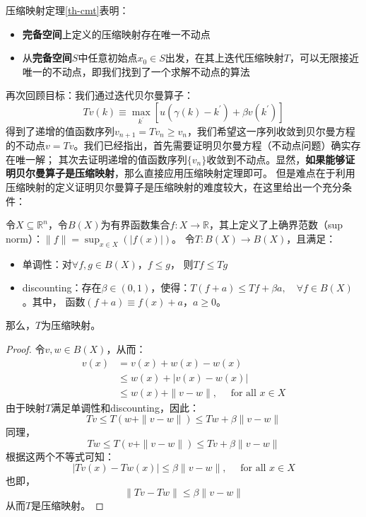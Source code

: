 压缩映射定理\ref{th-cmt}表明：
\begin{itemize}
    \item \textbf{完备空间}上定义的压缩映射存在唯一不动点
    \item 从\textbf{完备空间}$S$中任意初始点$x_0 \in S$出发，在其上迭代压缩映射$T$，可以无限接近唯一的不动点，即我们找到了一个求解不动点的算法
\end{itemize}

再次回顾目标：我们通过迭代贝尔曼算子：
$$
Tv\left(k\right) \equiv \max_{k^{\prime}} \left[u\left(\gamma\left(k\right)-k^{\prime}\right)+\beta v\left(k^{\prime}\right)\right]
$$
得到了递增的值函数序列$v_{n+1}=Tv_n \geq v_n$，我们希望这一序列收敛到贝尔曼方程的不动点$v=Tv$。我们已经指出，首先需要证明贝尔曼方程（不动点问题）确实存在唯一解；
其次去证明递增的值函数序列$\{v_n\}$收敛到不动点。显然，\textbf{如果能够证明贝尔曼算子是压缩映射}，那么直接应用压缩映射定理即可。
但是难点在于利用压缩映射的定义证明贝尔曼算子是压缩映射的难度较大，在这里给出一个充分条件：
\begin{theorem}[Blackwell充分条件]  \label{th-blackwell}
    令$X \subseteq \mathbb{R}^n$，令$B(X)$为有界函数集合$f: X \rightarrow \mathbb{R}$，其上定义了上确界范数（sup norm）：$\|f\|=\sup _{x \in X}(|f(x)|)$。
    令$T:B\left(X\right)\rightarrow B\left(X\right)$，且满足：
    \begin{itemize}
        \item 单调性：对$\forall f, g \in B(X)$，$f \leq g$， 则$T f \leq T g$
        \item discounting：存在$\beta \in \left(0,1\right)$，使得：$T(f+a) \leq T f+\beta a, \quad \forall f \in B(X)$。其中，
            函数$\left(f+a\right)\equiv f\left(x\right)+a$，$a \geq 0$。
    \end{itemize}
    那么，$T$为压缩映射。
\end{theorem}

\begin{proof}
    令$v, w \in B(X)$，从而：
    $$
    \begin{aligned}
        v(x) & =v(x)+w(x)-w(x) \\
        & \leq w(x)+|v(x)-w(x)| \\
        & \leq w(x)+\|v-w\|, \quad \text { for all } x \in X
    \end{aligned}
    $$
    由于映射$T$满足单调性和discounting，因此：
    $$
    T v \leq T(w+\|v-w\|) \leq T w+\beta\|v-w\|
    $$
    同理，
    $$
    T w \leq T(v+\|v-w\|) \leq T v+\beta\|v-w\|
    $$
    根据这两个不等式可知：
    $$
    |T v(x)-T w(x)| \leq \beta\|v-w\|, \quad \text { for all } x \in X
    $$
    也即，
    $$
    \|T v-T w\| \leq \beta\|v-w\|
    $$
    从而$T$是压缩映射。
\end{proof}

